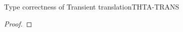 \documentclass[acmlarge, anonymous, authordraft, review]{acmart} %
\begin{document}
\begin{lemma}{Type correctness of Transient translation}{THTA-TRANS}
  \begin{conds}
    \cond{$\TR\K = \Kp$}
    \cond{$\TR\Env = \Envp$}
  \end{conds}

  \then\axiom{$\EnvType\Envp\cdot\Kp{\TRG{\e}\Env}{\t}$}

  \begin{proof} \indmsg{\EnvTypeW\Env\K\e\t}

% 
% 

\end{proof}
\end{lemma}
\end{document}
